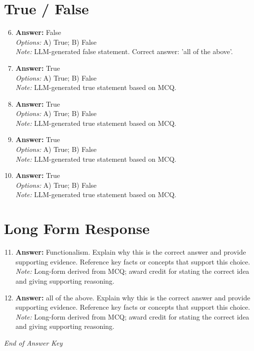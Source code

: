 \documentclass[12pt]{article}
\begin{document}
\section*{True / False}
\begin{enumerate}[label=\arabic*.]
\setcounter{enumi}{5}
\item \textbf{Answer:} False
\\ \textit{Options:} A) True; B) False
\\ \textit{Note:} LLM-generated false statement. Correct answer: 'all of the above'.
\item \textbf{Answer:} True
\\ \textit{Options:} A) True; B) False
\\ \textit{Note:} LLM-generated true statement based on MCQ.
\item \textbf{Answer:} True
\\ \textit{Options:} A) True; B) False
\\ \textit{Note:} LLM-generated true statement based on MCQ.
\item \textbf{Answer:} True
\\ \textit{Options:} A) True; B) False
\\ \textit{Note:} LLM-generated true statement based on MCQ.
\item \textbf{Answer:} True
\\ \textit{Options:} A) True; B) False
\\ \textit{Note:} LLM-generated true statement based on MCQ.
\end{enumerate}

\section*{Long Form Response}
\begin{enumerate}[label=\arabic*.]
\setcounter{enumi}{10}
\item \textbf{Answer:} Functionalism. Explain why this is the correct answer and provide supporting evidence. Reference key facts or concepts that support this choice.
\\ \textit{Note:} Long-form derived from MCQ; award credit for stating the correct idea and giving supporting reasoning.
\item \textbf{Answer:} all of the above. Explain why this is the correct answer and provide supporting evidence. Reference key facts or concepts that support this choice.
\\ \textit{Note:} Long-form derived from MCQ; award credit for stating the correct idea and giving supporting reasoning.
\end{enumerate}

\vfill
\noindent\textit{End of Answer Key}
\end{document}
